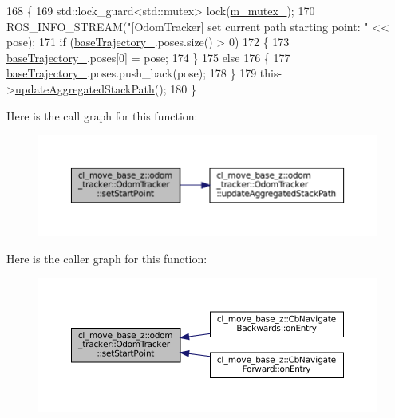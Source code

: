 \begin{DoxyCode}
168 \{
169   std::lock\_guard<std::mutex> lock(\hyperlink{classcl__move__base__z_1_1odom__tracker_1_1OdomTracker_aa371639e1eee269273dec8d3ab9dba0f}{m\_mutex\_});
170   ROS\_INFO\_STREAM(\textcolor{stringliteral}{"[OdomTracker] set current path starting point: "} << pose);
171   \textcolor{keywordflow}{if} (\hyperlink{classcl__move__base__z_1_1odom__tracker_1_1OdomTracker_a466d18a86df049f0f680e043bb5ea91f}{baseTrajectory\_}.poses.size() > 0)
172   \{
173     \hyperlink{classcl__move__base__z_1_1odom__tracker_1_1OdomTracker_a466d18a86df049f0f680e043bb5ea91f}{baseTrajectory\_}.poses[0] = pose;
174   \}
175   \textcolor{keywordflow}{else}
176   \{
177     \hyperlink{classcl__move__base__z_1_1odom__tracker_1_1OdomTracker_a466d18a86df049f0f680e043bb5ea91f}{baseTrajectory\_}.poses.push\_back(pose);
178   \}
179   this->\hyperlink{classcl__move__base__z_1_1odom__tracker_1_1OdomTracker_a7922f1e1e688a2ed62d32d9914985a9f}{updateAggregatedStackPath}();
180 \}
\end{DoxyCode}
Here is the call graph for this function\+:
\nopagebreak
\begin{figure}[H]
\begin{center}
\leavevmode
\includegraphics[width=350pt]{classcl__move__base__z_1_1odom__tracker_1_1OdomTracker_a9f4989c6353022c2ec3b0546c09bf3bc_cgraph}
\end{center}
\end{figure}
Here is the caller graph for this function\+:
\nopagebreak
\begin{figure}[H]
\begin{center}
\leavevmode
\includegraphics[width=350pt]{classcl__move__base__z_1_1odom__tracker_1_1OdomTracker_a9f4989c6353022c2ec3b0546c09bf3bc_icgraph}
\end{center}
\end{figure}
\mbox{\label{classcl__move__base__z_1_1odom__tracker_1_1OdomTracker_a4aefe72c155bd0d57c9f42b77a8928a6}} 
